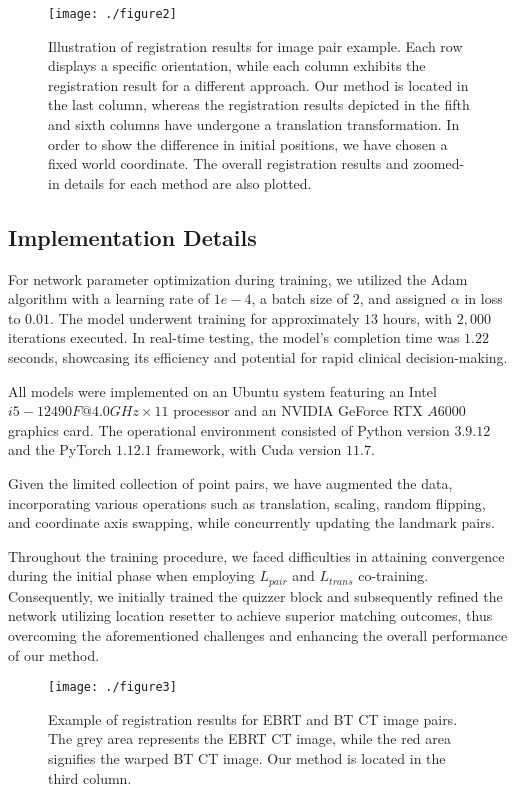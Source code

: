 \documentclass[preprint,review,12pt]{elsarticle}
\begin{document}
\begin{figure*}[htb]
	\centerline{\texttt{[image: ./figure2]}}
	\caption{Illustration of registration results for image pair example. Each row displays a specific orientation, while each column exhibits the registration result for a different approach. Our method is located in the last column, whereas the registration results depicted in the fifth and sixth columns have undergone a translation transformation. In order to show the difference in initial positions, we have chosen a fixed world coordinate. The overall registration results and zoomed-in details for each method are also plotted.}
	\label{fig:f3}
\end{figure*}

\subsection{Implementation Details}

For network parameter optimization during training, we utilized the Adam algorithm with a learning rate of $1e-4$, a batch size of $2$, and assigned $\alpha$ in loss to $0.01$. The model underwent training for approximately $13$ hours, with $2,000$ iterations executed. In real-time testing, the model's completion time was $1.22$ seconds, showcasing its efficiency and potential for rapid clinical decision-making.

All models were implemented on an Ubuntu system featuring an Intel $i5-12490F@4.0GHz \times 11$ processor and an NVIDIA GeForce RTX $A6000$ graphics card. The operational environment consisted of Python version $3.9.12$ and the PyTorch $1.12.1$ framework, with Cuda version $11.7$.

Given the limited collection of point pairs, we have augmented the data, incorporating various operations such as translation, scaling, random flipping, and coordinate axis swapping, while concurrently updating the landmark pairs.

Throughout the training procedure, we faced difficulties in attaining convergence during the initial phase when employing $L_{pair}$ and $L_{trans}$ co-training. Consequently, we initially trained the quizzer block and subsequently refined the network utilizing location resetter to achieve superior matching outcomes, thus overcoming the aforementioned challenges and enhancing the overall performance of our method.

\begin{figure*}[!htb]
	\centering
	\texttt{[image: ./figure3]}
	\caption{Example of registration results for EBRT and BT CT image pairs. The grey area represents the EBRT CT image, while the red area signifies the warped BT CT image. Our method is located in the third column.}
	\label{fig:f4}
\end{figure*}
\end{document}
